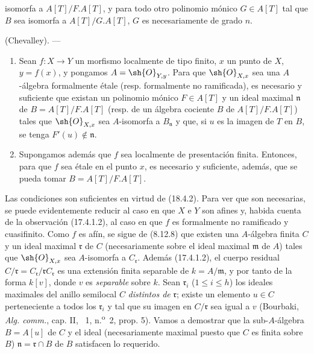 
isomorfa a $A[T]/F.A[T]$, y para todo otro polinomio mónico $G\in A[T]$ tal que $B$ sea isomorfa a $A[T]/G.A[T]$, $G$ es necesariamente de grado $n$.

\begin{theorem}[18.4.6]
\label{IV.18.4.6}
(Chevalley). ---
\begin{enumerate}
  \item[\textup{(i)}] Sean $f:X\to Y$ un morfismo localmente de tipo finito, $x$ un punto de $X$, $y=f(x)$, y pongamos $A=\sh{O}_{Y,y}$. Para que $\sh{O}_{X,x}$ sea una $A$-álgebra formalmente étale \textup{(resp.} formalmente no ramificada\textup{)}, es necesario y suficiente que existan un polinomio mónico $F\in A[T]$ y un ideal maximal $\mathfrak n$ de $B=A[T]/F.A[T]$ \textup{(resp.} de un álgebra cociente $B$ de $A[T]/F.A[T]$\textup{)} tales que $\sh{O}_{X,x}$ sea $A$-isomorfa a $B_{\mathfrak n}$ y que, si $u$ es la imagen de $T$ en $B$, se tenga $F'(u)\notin\mathfrak n$.
  \item[\textup{(ii)}] Supongamos además que $f$ sea localmente de presentación finita. Entonces, para que $f$ sea étale en el punto $x$, es necesario y suficiente, además, que se pueda tomar $B=A[T]/F.A[T]$.
\end{enumerate}
\end{theorem}

Las condiciones son suficientes en virtud de (18.4.2). Para ver que son necesarias, se puede evidentemente reducir al caso en que $X$ e $Y$ son afines y, habida cuenta de la observación (17.4.1.2), al caso en que $f$ es formalmente no ramificado y cuasifinito. Como $f$ es afín, se sigue de (8.12.8) que existen una $A$-álgebra finita $C$ y un ideal maximal $\mathfrak r$ de $C$ (necesariamente sobre el ideal maximal $\mathfrak m$ de $A$) tales que $\sh{O}_{X,x}$ sea $A$-isomorfa a $C_{\mathfrak r}$. Además (17.4.1.2), el cuerpo residual $C/\mathfrak r=C_{\mathfrak r}/\mathfrak rC_{\mathfrak r}$ es una extensión finita separable de $k=A/\mathfrak m$, y por tanto de la forma $k[v]$, donde $v$ es \emph{separable} sobre $k$. Sean $\mathfrak r_i$ ($1\leq i\leq h$) los ideales maximales del anillo semilocal $C$ \emph{distintos de} $\mathfrak r$; existe un elemento $u\in C$ perteneciente a todos los $\mathfrak r_i$ y tal que su imagen en $C/\mathfrak r$ sea igual a $v$ (Bourbaki, \emph{Alg. comm.}, cap. II, \textsection~1, n.\textsuperscript{o}~2, prop. 5). Vamos a demostrar que la sub-$A$-álgebra $B=A[u]$ de $C$ y el ideal (necesariamente maximal puesto que $C$ es finita sobre $B$) $\mathfrak n=\mathfrak r\cap B$ de $B$ satisfacen lo requerido.

